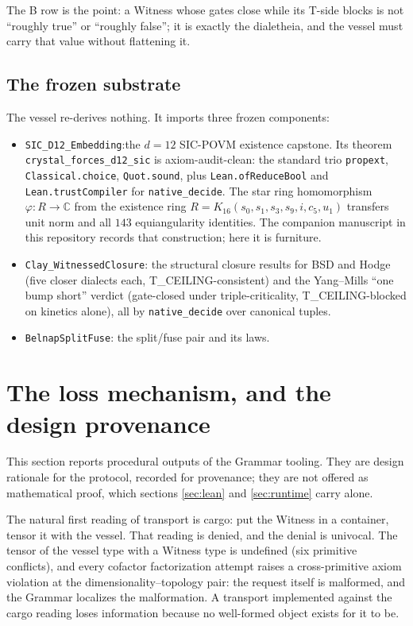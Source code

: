 \documentclass[12pt,a4paper]{article}
\newcommand{\bB}{\textsf{B}}
\begin{document}
The \bB{} row is the point: a Witness whose gates close while its T-side blocks
is not ``roughly true'' or ``roughly false''; it is exactly the dialetheia, and
the vessel must carry that value without flattening it.

\subsection{The frozen substrate}

The vessel re-derives nothing.  It imports three frozen components:
\begin{itemize}
\item \texttt{SIC\_D12\_Embedding}:\allowbreak the $d = 12$ SIC-POVM existence
capstone.  Its theorem
\texttt{crystal\_\allowbreak forces\_\allowbreak d12\_\allowbreak sic} is
axiom-audit-clean: the standard trio \texttt{propext},
\texttt{Classical.choice}, \texttt{Quot.sound}, plus
\texttt{Lean.ofReduceBool} and \texttt{Lean.trustCompiler} for
\texttt{native\_decide}.  The star ring homomorphism $\varphi : R \to \mathbb{C}$
from the existence ring $R = K_{16}(s_0,s_1,s_3,s_9,i,c_5,u_1)$ transfers unit
norm and all $143$ equiangularity identities.  The companion manuscript in this
repository records that construction; here it is furniture.
\item \texttt{Clay\_WitnessedClosure}: the structural closure results for BSD
and Hodge (five closer dialects each, T\_CEILING-consistent) and the
Yang--Mills ``one bump short'' verdict (gate-closed under triple-criticality,
T\_CEILING-blocked on kinetics alone), all by \texttt{native\_decide} over
canonical tuples.
\item \texttt{BelnapSplitFuse}: the split/fuse pair and its laws.
\end{itemize}

\section{The loss mechanism, and the design provenance}
\label{sec:provenance}

This section reports procedural outputs of the Grammar tooling.  They are design
rationale for the protocol, recorded for provenance; they are not offered as
mathematical proof, which sections \ref{sec:lean} and \ref{sec:runtime} carry
alone.

The natural first reading of transport is cargo: put the Witness in a container,
tensor it with the vessel.  That reading is denied, and the denial is univocal.
The tensor of the vessel type with a Witness type is undefined (six primitive
conflicts), and every cofactor factorization attempt raises a cross-primitive
axiom violation at the dimensionality--topology pair: the request itself is
malformed, and the Grammar localizes the malformation.  A transport implemented
against the cargo reading loses information because no well-formed object exists
for it to be.
\end{document}
